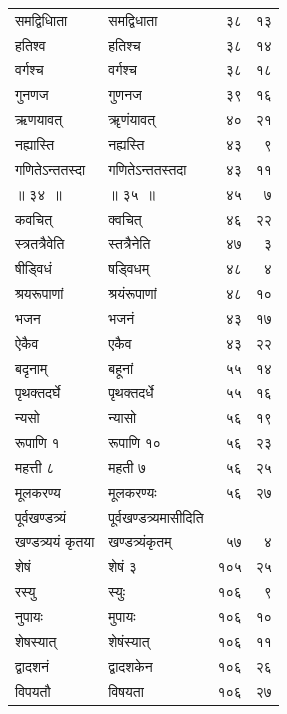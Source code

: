 \documentclass[11pt, openany]{book}
\begin{document}
{\begin{longtable}{llrr}
\newpage
समद्विधिाता& समद्विधाता& ३८& १३\\
हतिश्व &हतिश्च &३८& १४\\
वर्गश्च &वर्गश्च &३८& १८\\
गुनणज &गुणनज& ३९& १६\\
ऋणयावत् &ॠणंयावत् &४०& २१\\
नह्यास्ति &नह्यस्ति& ४३& ९\\
गणितेऽन्ततस्दा& गणितेऽन्ततस्तदा &४३ &११\\
॥ ३४~॥~&॥ ३५~॥& ४५& ७\\
कवचित् &क्वचित् &४६ &२२\\
स्त्रतत्रैवेति& स्तत्रैनेति& ४७& ३\\
षीड्विधं &षड्विधम् &४८& ४\\
श्रयरूपाणां& श्रयंरूपाणां& ४८& १०\\
भजन &भजनं &४३& १७\\
ऐकैव &एकैव &४३& २२\\
बदृनाम् &बहूनां &५५& १४\\
पृथक्तदर्घे &पृथक्तदर्धे &५५& १६\\
न्यसो &न्यासो &५६& १९\\
रूपाणि १& रूपाणि १०& ५६& २३\\
महत्ती ८ &महती ७& ५६& २५\\
मूलकरण्य &मूलकरण्यः& ५६ &२७\\
पूर्वखण्डत्र्यं &पूर्वखण्डत्र्यमासीदिति &&\\
खण्डत्र्ययं कृतया &खण्डत्र्यंकृतम् &५७& ४\\
शेषं &शेषं ३& १०५& २५\\
रस्यु &स्युः &१०६& ९\\
नुपायः &मुपायः &१०६& १०\\
शेषस्यात् &शेषंस्यात् &१०६& ११\\
द्वादशनं &द्वादशकेन &१०६& २६\\
विपयतौ& विषयता &१०६& २७\\


\end{longtable}}
\end{document}
